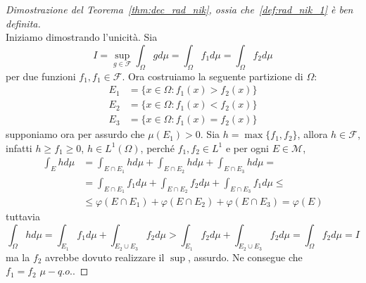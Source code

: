 \begin{proof}[Dimostrazione del Teorema~\ref{thm:dec_rad_nik}, ossia
    che~\ref{def:rad_nik_1} è ben definita] \(\)  \\
    Iniziamo dimostrando l'unicità. Sia 
    \[
        I = \sup_{g \in \mathcal{F}} \int_\Omega g d\mu = \int_\Omega f_{1} d\mu
        = \int_\Omega f_{2} d\mu
    \]
    per due funzioni \(f_{1} ,f_{1} \in \mathcal{F}\).
    Ora costruiamo la seguente partizione di \(\Omega\):
    \begin{align*}
        E_{1} &= \{ x \in \Omega : f_{1}{(x)} > f_{2}{(x)}\} \\
        E_{2} &= \{x \in \Omega : f_{1}{(x)} <f_{2}{(x)}\} \\
        E_{3} &= \{x \in \Omega : f_{1}{(x)} = f_{2}{(x)}\}
    \end{align*}
    supponiamo ora per assurdo che \(\mu{(E_{1})} > 0\). Sia \(h = \max \{f_{1},
    f_{2}\} \), allora \(h \in \mathcal{F}\), infatti \(h \ge f_{1} \ge 0\), \(h
    \in L^{1}{(\Omega)}\), perché \(f_{1}, f_{2} \in L^{1}\) e per ogni \(E \in
    \mathcal{M}\), 
    \begin{align*}
        \int_E h d\mu &= \int_{E \cap E_{1}} h d\mu + \int_{E \cap E_{2}} h d\mu
        + \int_{E \cap E_{3}} h d\mu =\\
        &= \int_{E \cap E_{1}} f_{1} d\mu + \int_{E \cap E_{2}} f_{2} d\mu +
        \int_{E \cap E_{3}} f_{1} d\mu \le \\
        &\le \varphi {(E \cap E_{1})} + \varphi {(E \cap E_{2})} + \varphi {(E
        \cap E_{3})} = \varphi {(E)}
    \end{align*}
    tuttavia
    \[
        \int_{\Omega} h d\mu = \int_{E_{1}} f_{1} d\mu + \int_{E_{2} \cup E_{3}} f_{2} d\mu
    > \int_{E_{1}} f_{2} d\mu + \int_{E_{2} \cup E_{3}} f_{2}
        d\mu = \int_{\Omega} f_{2} d\mu = I
    \]
    ma la \(f_{2}\) avrebbe dovuto realizzare il \(\sup\), assurdo. Ne consegue
    che \(f_{1} = f_{2}\,\, \mu-q.o. \).


\end{proof}
